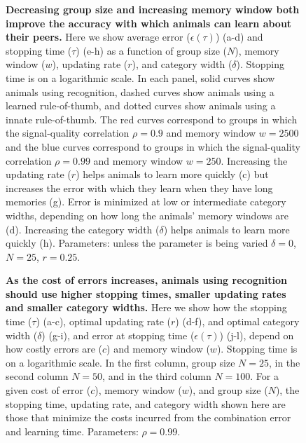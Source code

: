 \begin{figure}
\caption{\sffamily\small\textbf{Decreasing group size and increasing memory window both improve the accuracy with which animals can learn about their peers.} Here we show average error ($\epsilon(\tau)$) (a-d) and stopping time ($\tau$) (e-h) as a function of group size ($N$), memory window ($w$), updating rate ($r$), and category width ($\delta$). Stopping time is on a logarithmic scale. In each panel, solid curves show animals using recognition, dashed curves show animals using a learned rule-of-thumb, and dotted curves show animals using a innate rule-of-thumb. The red curves correspond to groups in which the signal-quality correlation $\rho=0.9$ and memory window $w=2500$ and the blue curves correspond to groups in which the signal-quality correlation $\rho=0.99$ and memory window $w=250$. Increasing the updating rate ($r$) helps animals to learn more quickly (c) but increases the error with which they learn when they have long memories (g). Error is minimized at low or intermediate category widths, depending on how long the animals' memory windows are (d). Increasing the category width ($\delta$) helps animals to learn more quickly (h). Parameters: unless the parameter is being varied $\delta = 0$, $N=25$, $r=0.25$.}
\label{parameters}
\end{figure}

\begin{figure}
\caption{\sffamily\small\textbf{As the cost of errors increases, animals using recognition should use higher stopping times, smaller updating rates and smaller category widths.} Here we show how the stopping time ($\tau$) (a-c),  optimal updating rate ($r$) (d-f), and optimal category width ($\delta$) (g-i), and error at stopping time ($\epsilon(\tau)$) (j-l), depend on how costly errors are ($c$) and memory window ($w$). Stopping time is on a logarithmic scale. In the first column, group size $N=25$, in the second column $N=50$, and in the third column $N=100$. For a given cost of error ($c$), memory window ($w$), and group size ($N$), the stopping time, updating rate, and category width shown here are those that minimize the costs incurred from the combination error and learning time. Parameters: $\rho=0.99$. }
\label{optimization}
\end{figure}


